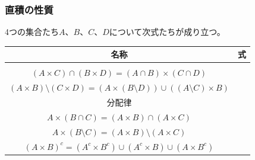 \documentclass[a4paper]{jsarticle}
\begin{document}
\subsubsection{直積の性質}%
\begin{thm}
\label{1.2.2.4}
4つの集合たち$A$、$B$、$C$、$D$について次式たちが成り立つ。
\begin{longtable}[c]{|c|c|}
\hline
名称 & 式 \\
\hline \hline
& \hspace{-0.5em}\begin{tabular}{c}
  $(A \times C) \cup (B \times D) = \left( (A \setminus B) \times C \right) \cup \left( (A \cap B) \times (C \cup D) \right) \cup \left( (B \setminus A) \times D \right) $\\
  $(A \times C) \cap (B \times D) = (A \cap B) \times (C \cap D) $\\
  $(A \times B) \setminus (C \times D) = \left( A \times (B \setminus D) \right) \cup \left( (A \setminus C) \times B \right)$ \end{tabular}\\
\hline
分配律 & \hspace{-0.5em}\begin{tabular}{c}
  $A \times (B \cup C) = (A \times B) \cup (A \times C) $\\
  $A \times (B \cap C) = (A \times B) \cap (A \times C) $\\
  $A \times (B \setminus C) = (A \times B) \setminus (A \times C) $ \\
  $(A \times B)^{c} = \left( A^{c} \times B^{c} \right) \cup \left( A^{c} \times B \right) \cup \left( A \times B^{c} \right)$ \end{tabular} \\
\hline
\end{longtable}
\end{thm}
\end{document}
